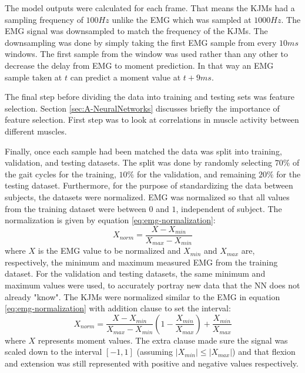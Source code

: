 \documentclass[../main.tex]{subfiles}
\begin{document}
The model outputs were calculated for each frame.
That means the \acp{KJM} had a sampling frequency of $100Hz$ unlike the \ac{EMG} which was sampled at $1000Hz$.
The \ac{EMG} signal was downsampled to match the frequency of the \acp{KJM}. 
The downsampling was done by simply taking the first \ac{EMG} sample from every $10ms$ windows. 
The first sample from the window was used rather than any other to decrease the delay from \ac{EMG} to moment prediction. 
In that way an \ac{EMG} sample taken at $t$ can predict a moment value at $t+9ms$. 

The final step before dividing the data into training and testing sets was feature selection.
Section \ref{sec:A-NeuralNetworks} discusses briefly the importance of feature selection.
First step was to look at correlations in muscle activity between different muscles.


Finally, once each sample had been matched the data was split into training, validation, and testing datasets.
The split was done by randomly selecting $70\%$ of the gait cycles for the training, $10\%$ for the validation, and remaining $20\%$ for the testing dataset.
Furthermore, for the purpose of standardizing the data between subjects, the datasets were normalized.
\ac{EMG} was normalized so that all values from the training dataset were between $0$ and $1$, independent of subject.
The normalization is given by equation \ref{eq:emg-normalization}:
\begin{equation}
\label{eq:emg-normalization}
    X_{norm} = \frac{X - X_{min}}{X_{max} - X_{min}}
\end{equation}
where $X$ is the \ac{EMG} value to be normalized and $X_{min}$ and $X_{max}$ are, respectively, the minimum and maximum measured \ac{EMG} from the training dataset. 
For the validation and testing datasets, the same minimum and maximum values were used, to accurately portray new data that the \ac{NN} does not already "know".
The \acp{KJM} were normalized similar to the \ac{EMG} in equation \ref{eq:emg-normalization} with addition clause to set the interval:
\begin{equation}
\label{eq:moment-normalization}
    X_{norm} = \frac{X - X_{min}}{X_{max} - X_{min}}\left(1 - \frac{X_{min}}{X_{max}}\right) + \frac{X_{min}}{X_{max}}
\end{equation}
where $X$ represents moment values. 
The extra clause made sure the signal was scaled down to the interval $[-1,1]$ (assuming $\left|X_{min}\right| \leq \left|X_{max}\right|$) and that flexion and extension was still represented with positive and negative values respectively.
\end{document}
